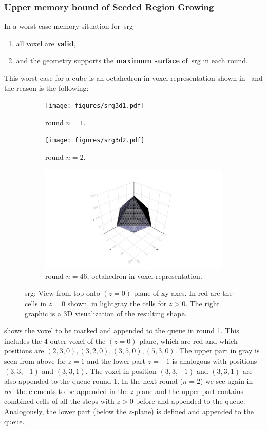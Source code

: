 \documentclass{article}
\begin{document}
\subsubsection{Upper memory bound of Seeded Region Growing}\label{subsubsec:uppermembound}
In a worst-case memory situation for~\ac{srg}
\begin{enumerate}
  \item all voxel are \textbf{valid},
  \item and the geometry supports the \textbf{maximum surface} of~\ac{srg} in each round.
\end{enumerate}
This worst case for a cube is an octahedron in voxel-representation shown in~ and the reason is the following:

\begin{figure}[h]
\centering
\begin{subfigure}[b]{0.275\linewidth}%
\centering
  \texttt{[image: figures/srg3d1.pdf]}
  \caption{round $n=1$.}\label{fig:srg3d1}%
\end{subfigure}%
\begin{subfigure}[b]{0.275\linewidth}%
\centering
  \texttt{[image: figures/srg3d2.pdf]}
  \caption{round $n=2$.}\label{fig:srg3d2}%
\end{subfigure}%
\begin{subfigure}[b]{0.45\linewidth}%
\centering
  \includegraphics[trim=13.5cm 6.8cm 13.5cm 5cm, clip, width=0.5\linewidth]{algorithm_visualisation/srgsteps/srgstep45.png}
  \caption{round $n=46$, octahedron in voxel-representation.}\label{fig:octahedron}%
\end{subfigure}%
  \caption{\acl{srg}: View from top onto $(z=0)$-plane of xy-axes. In red are the cells in $z=0$ shown, in lightgray the cells for $z>0$. The right graphic is a 3D visualization of the resulting shape.}
\end{figure}\label{fig:memorybound}

 shows the voxel to be marked and appended to the queue in round 1.
This includes the 4 outer voxel of the $(z=0)$-plane, which are red and which positions are $(2,3,0),(3,2,0),(3,5,0),(5,3,0)$.
The upper part in gray is seen from above for $z=1$ and the lower part $z=-1$ is analogous with positions $(3,3,-1)$ and $(3,3,1)$.
The voxel in position $(3,3,-1)$ and $(3,3,1)$ are also appended to the queue round 1.
In the next round ($n=2$) we see again in red the elements to be appended in the $z$-plane and the upper part contains combined cells of all the steps with $z>0$ before and appended to the queue.
Analogously, the lower part (below the $z$-plane) is defined and appended to the queue.\par
\end{document}
